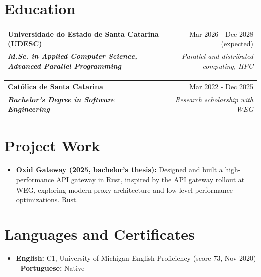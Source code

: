\documentclass[a4paper,9pt]{extarticle}
\makeatletter
\newcommand{\role}[4]{%
  \begin{tabularx}{\linewidth}{@{}X r@{}}
    \textcolor[HTML]{1C033C}{\textbf{#1}} & \textcolor[HTML]{371e77}{#2} \\[1pt]
    \textcolor[HTML]{371e77}{\textbf{\textit{#3}}} & \textcolor[HTML]{4B28A4}{\textit{#4}} \\
  \end{tabularx}\par\vspace{1pt}%
}
\makeatother
\begin{document}
\section{Education}
\role{Universidade do Estado de Santa Catarina (UDESC)}{Mar 2026 - Dec 2028 (expected)}{M.Sc. in Applied Computer Science, Advanced Parallel Programming}{Parallel and distributed computing, HPC}
\role{Católica de Santa Catarina}{Mar 2022 - Dec 2025}{Bachelor's Degree in Software Engineering}{Research scholarship with WEG}

\section{Project Work}
\begin{itemize}
    \item \textbf{Oxid Gateway (2025, bachelor's thesis):} Designed and built a high-performance API gateway in Rust, inspired by the API gateway rollout at WEG, exploring modern proxy architecture and low-level performance optimizations. Rust.
\end{itemize}

\section{Languages and Certificates}
\begin{itemize}
    \item \textbf{English:} C1, University of Michigan English Proficiency (score 73, Nov 2020) $|$ \textbf{Portuguese:} Native
\end{itemize}
\end{document}
